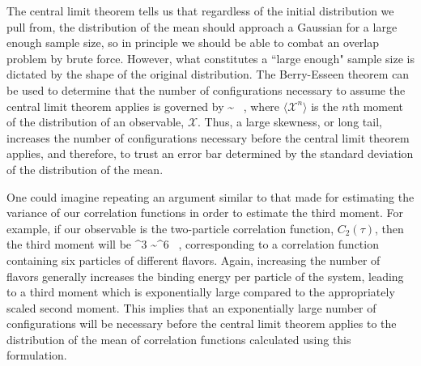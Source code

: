 The central limit theorem tells us that regardless of the initial distribution we pull from, the distribution of the mean should approach a Gaussian for a large enough sample size, so in principle we should be able to combat an overlap problem by brute force. However, what constitutes a ``large enough" sample size is dictated by the shape of the original distribution. The Berry-Esseen theorem \cite{BerryEsseen1,BerryEsseen2} can be used to determine that the number of configurations necessary to assume the central limit theorem applies is governed by
\beq
{} \sim {} \ ,
\eeq
where $\langle \mathcal{X}^n \rangle$ is the $n$th moment of the distribution of an observable, $\mathcal{X}$. Thus, a large skewness, or long tail, increases the number of configurations necessary before the central limit theorem applies, and therefore, to trust an error bar determined by the standard deviation of the distribution of the mean.

One could imagine repeating an argument similar to that made for estimating the variance of our correlation functions in order to estimate the third moment. For example, if our observable is the two-particle correlation function, $C_2(\tau)$, then the third moment will be
\beq
\langle {}^3 \rangle \sim \langle {}^6 \rangle \ ,
\eeq
corresponding to a correlation function containing six particles of different flavors. Again, increasing the number of flavors generally increases the binding energy per particle of the system, leading to a third moment which is exponentially large compared to the appropriately scaled second moment. This implies that an exponentially large number of configurations will be necessary before the central limit theorem applies to the distribution of the mean of correlation functions calculated using this formulation. 

